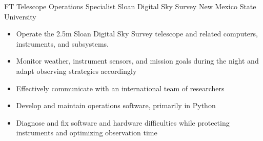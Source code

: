     {FT} %
    {Telescope Operations Specialist} %
    {Sloan Digital Sky Survey} %
    {New Mexico State University}
    {\begin{itemize}
    \setlength\itemsep{0.1em} 
        \item Operate the 2.5m Sloan Digital Sky Survey telescope and related
            computers, instruments, and subsystems.
        \item Monitor weather, instrument sensors, and mission goals during the
            night and adapt observing strategies accordingly
        \item Effectively communicate with an international team of researchers
        \item Develop and maintain operations software, primarily in Python
        \item Diagnose and fix software and hardware
            difficulties while protecting instruments and optimizing observation
            time
    \end{itemize}
}
